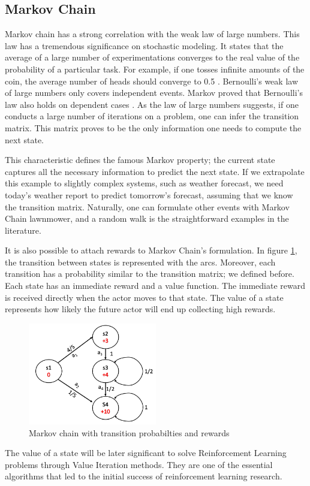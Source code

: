 \subsection{Markov Chain}

Markov chain has a strong correlation with the weak law of large numbers. This law has a tremendous significance on stochastic modeling. It states that the average of a large number of experimentations converges to the real value of the probability of a particular task. For example, if one tosses infinite amounts of the coin, the average number of heads should converge to 0.5 \cite{Gagniuc2017}. 
Bernoulli's weak law of large numbers only covers independent events. Markov proved that Bernoulli's law also holds on dependent cases \cite{Gagniuc2017}. 
As the law of large numbers suggests, if one conducts a large number of iterations on a problem, one can infer the transition matrix. This matrix proves to be the only information one needs to compute the next state.

This characteristic defines the famous Markov property; the current state captures all the necessary information to predict the next state. If we extrapolate this example to slightly complex systems, such as weather forecast, we need today's weather report to predict tomorrow's forecast, assuming that we know the transition matrix. Naturally, one can formulate other events with Markov Chain lawnmower, and a random walk is the straightforward examples in the literature\cite{Gagniuc2017}.

It is also possible to attach rewards to Markov Chain's formulation. In figure \ref{fig: markov_chain}, the transition between states is represented with the arcs. Moreover, each transition has a probability similar to the transition matrix; we defined before. Each state has an immediate reward and a value function. The immediate reward is received directly when the actor moves to that state. The value of a state represents how likely the future actor will end up collecting high rewards. 

\begin{figure}[htbp]
    \centering
    \includegraphics[width=0.5\textwidth]{figures/markovchain}
    \caption{Markov chain with transition probabilties and rewards}
    \label{fig: markov_chain}
\end{figure}

The value of a state will be later significant to solve Reinforcement Learning problems through Value Iteration methods. They are one of the essential algorithms that led to the initial success of reinforcement learning research.
